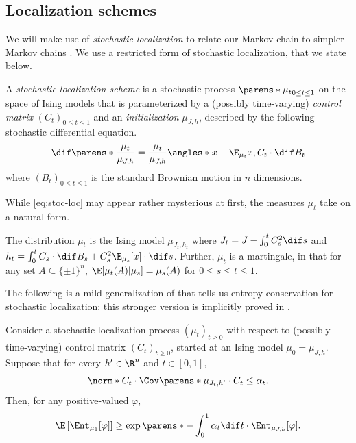 \documentclass[11pt,letterpaper]{article}
\begin{document}
\subsection{Localization schemes}   \label{sec:loc-schemes}

    We will make use of \emph{stochastic localization} to relate our Markov chain to simpler Markov chains \cite{Eld13,CE22}.
    We use a restricted form of stochastic localization, that we state below.
    \begin{definition}    \label{def:stoc-loc}
        A \emph{stochastic localization scheme} is a stochastic process $\parens*{\mu_{t}}_{0\le t\le 1}$ on the space of Ising models that is parameterized by a (possibly time-varying) \emph{control matrix} $(C_t)_{0 \le t \le 1}$ and an \emph{initialization} $\mu_{J,h}$, described by the following stochastic differential equation.
        \begin{equation}
            \dif\parens*{\frac{\mu_{t}}{\mu_{J,h}}} = \frac{\mu_{t}}{\mu_{J,h}} \angles*{ x-\E_{\mu_{t}} x, C_t \cdot \dif B_t } \label{eq:stoc-loc}
        \end{equation}
        where $(B_t)_{0\le t\le 1}$ is the standard Brownian motion in $n$ dimensions.
    \end{definition}
    While \eqref{eq:stoc-loc} may appear rather mysterious at first, the measures $\mu_{t}$ take on a natural form.
    \begin{fact}    \label{fact:stoc-loc-form}
        The distribution $\mu_t$ is the Ising model
        \(
            \mu_{J_t, h_t}
        \)
        where $J_t = J - \int_{0}^{t} C_s^2 \dif s$ and $h_t = \int_0^t C_s \cdot \dif B_s + C_s^2 \E_{\mu_s} [x] \cdot \dif s$.
        Further, $\mu_t$ is a martingale, in that for any set $A \subseteq \{\pm 1\}^n$, $\E[\mu_t(A)|\mu_s] = \mu_s(A)$ for $0\le s\le t\le 1$.
    \end{fact}

    The following is a mild generalization of \cite[Proposition 39 and Lemma 40]{CE22} that tells us entropy conservation for stochastic localization; this stronger version is implicitly proved in \cite[Lemma 40]{CE22}. 
    \begin{lemma}   \label{lem:entropic-stability}
        Consider a stochastic localization process $(\mu_t)_{t \ge 0}$ with respect to (possibly time-varying) control matrix $(C_t)_{t \ge 0}$, started at an Ising model $\mu_0 = \mu_{J,h}$. Suppose that for every $h'\in\R^n$ and $t \in [0,1]$,
        \[
            \norm*{C_t \cdot \Cov\parens*{\mu_{J_t, h'}} \cdot C_t} \le \alpha_t.
        \]
        Then, for any positive-valued $\varphi$,
        \[
            \E \left[\Ent_{\mu_{1}}[\varphi]\right] \ge \exp\parens*{-\int_{0}^{1} \alpha_t \dif t} \cdot \Ent_{\mu_{J,h}}[\varphi].
        \]
    \end{lemma}
\end{document}
